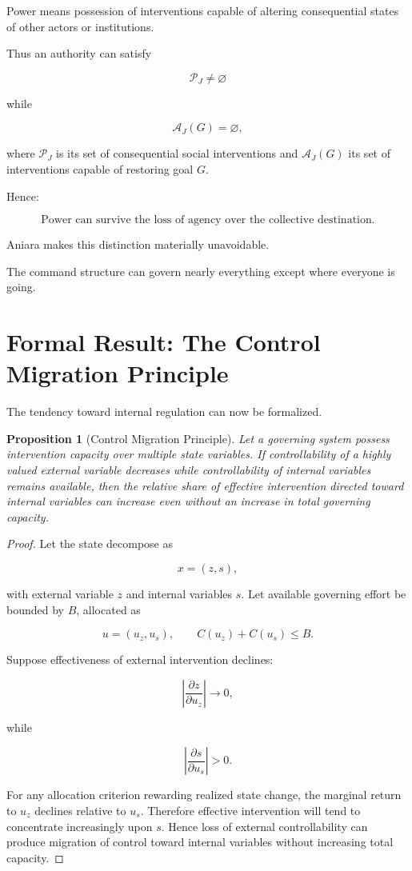 \documentclass[11pt,oneside]{book}
\newtheorem{proposition}[theorem]{Proposition}
\theoremstyle{definition}
\theoremstyle{remark}
\begin{document}
Power means possession of interventions capable of altering consequential states of other actors or institutions.

Thus an authority can satisfy

\[
\mathcal P_J\neq\varnothing
\]

while

\[
\mathcal A_J(G)=\varnothing,
\]

where \(\mathcal P_J\) is its set of consequential social interventions and \(\mathcal A_J(G)\) its set of interventions capable of restoring goal \(G\).

Hence:

\[
\boxed{
\text{Power can survive the loss of agency over the collective destination.}
}
\]

Aniara makes this distinction materially unavoidable.

The command structure can govern nearly everything except where everyone is going.

\section{Formal Result: The Control Migration Principle}

The tendency toward internal regulation can now be formalized.

\begin{proposition}[Control Migration Principle]
Let a governing system possess intervention capacity over multiple state variables. If controllability of a highly valued external variable decreases while controllability of internal variables remains available, then the relative share of effective intervention directed toward internal variables can increase even without an increase in total governing capacity.
\end{proposition}

\begin{proof}
Let the state decompose as

\[
x=(z,s),
\]

with external variable \(z\) and internal variables \(s\). Let available governing effort be bounded by \(B\), allocated as

\[
u=(u_z,u_s),
\qquad
C(u_z)+C(u_s)\leq B.
\]

Suppose effectiveness of external intervention declines:

\[
\left|
\frac{\partial z}{\partial u_z}
\right|
\rightarrow0,
\]

while

\[
\left|
\frac{\partial s}{\partial u_s}
\right|>0.
\]

For any allocation criterion rewarding realized state change, the marginal return to \(u_z\) declines relative to \(u_s\). Therefore effective intervention will tend to concentrate increasingly upon \(s\). Hence loss of external controllability can produce migration of control toward internal variables without increasing total capacity.
\end{proof}
\end{document}
